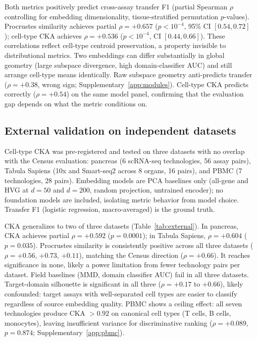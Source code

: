 \documentclass[11pt]{article}
\begin{document}
Both metrics positively predict cross-assay transfer F1 (partial Spearman $\rho$ controlling for embedding dimensionality, tissue-stratified permutation $p$-values). Procrustes similarity achieves partial $\rho = +0.657$ ($p < 10^{-4}$, 95\% CI $[0.54, 0.72]$); cell-type CKA achieves $\rho = +0.536$ ($p < 10^{-4}$, CI $[0.44, 0.66]$). These correlations reflect cell-type centroid preservation, a property invisible to distributional metrics. Two embeddings can differ substantially in global geometry (large subspace divergence, high domain-classifier AUC) and still arrange cell-type means identically. Raw subspace geometry anti-predicts transfer ($\rho = +0.38$, wrong sign; Supplementary~\ref{app:modules}). Cell-type CKA predicts correctly ($\rho = +0.54$) on the same model panel, confirming that the evaluation gap depends on what the metric conditions on.


\subsection{External validation on independent datasets}
\label{sec:external}

Cell-type CKA was pre-registered and tested on three datasets with no overlap with the Census evaluation: pancreas \citep{luecken2022scib} (6 scRNA-seq technologies, 56 assay pairs), Tabula Sapiens \citep{tabulasapiens2022} (10x and Smart-seq2 across 8 organs, 16 pairs), and PBMC \citep{ding2020systematic} (7 technologies, 28 pairs). Embedding models are PCA baselines only (all-gene and HVG at $d = 50$ and $d = 200$, random projection, untrained encoder); no foundation models are included, isolating metric behavior from model choice. Transfer F1 (logistic regression, macro-averaged) is the ground truth.

CKA generalizes to two of three datasets (Table~\ref{tab:external}). In pancreas, CKA achieves partial $\rho = +0.592$ ($p = 0.0001$); in Tabula Sapiens, $\rho = +0.604$ ($p = 0.035$). Procrustes similarity is consistently positive across all three datasets ($\rho = +0.56$, $+0.73$, $+0.11$), matching the Census direction ($\rho = +0.66$). It reaches significance in none, likely a power limitation from fewer technology pairs per dataset. Field baselines (MMD, domain classifier AUC) fail in all three datasets. Target-domain silhouette is significant in all three ($\rho = +0.17$ to $+0.66$), likely confounded: target assays with well-separated cell types are easier to classify regardless of source embedding quality. PBMC shows a ceiling effect: all seven technologies produce CKA $> 0.92$ on canonical cell types (T cells, B cells, monocytes), leaving insufficient variance for discriminative ranking ($\rho = +0.089$, $p = 0.874$; Supplementary~\ref{app:pbmc}).
\end{document}
